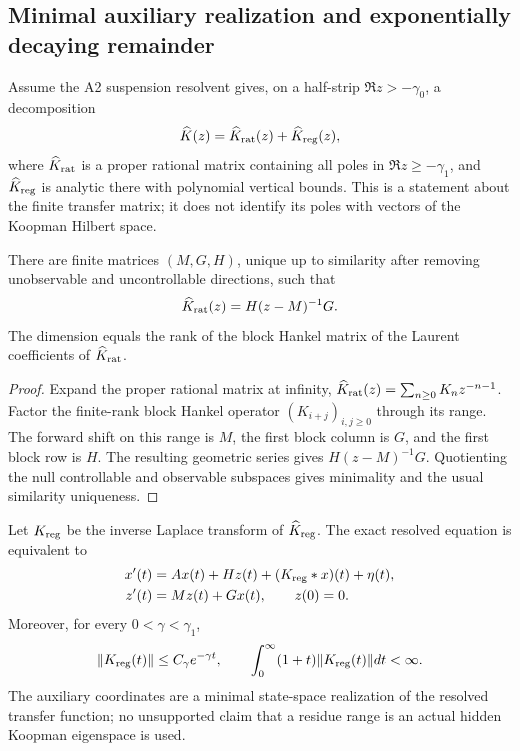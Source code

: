 \subsection{Minimal auxiliary realization and exponentially decaying remainder}

Assume the A2 suspension resolvent gives, on a half-strip
\(\Re z>-\gamma_0\), a decomposition
\[
 \widehat K(z)=\widehat K_{\rm rat}(z)+
 \widehat K_{\rm reg}(z),
\]
where \(\widehat K_{\rm rat}\) is a proper rational matrix containing all
poles in \(\Re z\ge-\gamma_1\), and
\(\widehat K_{\rm reg}\) is analytic there with polynomial vertical bounds.
This is a statement about the finite transfer matrix; it does not identify its
poles with vectors of the Koopman Hilbert space.

\begin{lemma}
\label{lem:r4-a4-realization}
There are finite matrices \((M,G,H)\), unique up to similarity after removing
unobservable and uncontrollable directions, such that
\[
 \widehat K_{\rm rat}(z)=H(z-M)^{-1}G.
\]
The dimension equals the rank of the block Hankel matrix of the Laurent
coefficients of \(\widehat K_{\rm rat}\).
\end{lemma}

\begin{proof}
Expand the proper rational matrix at infinity,
\(\widehat K_{\rm rat}(z)=\sum_{n\ge0}K_nz^{-n-1}\).  Factor the finite-rank
block Hankel operator \((K_{i+j})_{i,j\ge0}\) through its range.  The forward
shift on this range is \(M\), the first block column is \(G\), and the first
block row is \(H\).  The resulting geometric series gives
\(H(z-M)^{-1}G\).  Quotienting the null controllable and observable subspaces
gives minimality and the usual similarity uniqueness.
\end{proof}

\begin{theorem}
\label{thm:r3-a4-memory-decay}
Let \(K_{\rm reg}\) be the inverse Laplace transform of
\(\widehat K_{\rm reg}\).  The exact resolved equation is equivalent to
\[
 \begin{aligned}
 x'(t)&=Ax(t)+Hz(t)+(K_{\rm reg}*x)(t)+\eta(t),\\
 z'(t)&=Mz(t)+Gx(t),\qquad z(0)=0.
 \end{aligned}
\]
Moreover, for every \(0<\gamma<\gamma_1\),
\[
 \|K_{\rm reg}(t)\|\le C_\gamma e^{-\gamma t},
 \qquad
 \int_0^\infty(1+t)\|K_{\rm reg}(t)\|dt<\infty.
\]
The auxiliary coordinates are a minimal state-space realization of the
resolved transfer function; no unsupported claim that a residue range is an
actual hidden Koopman eigenspace is used.
\end{theorem}

